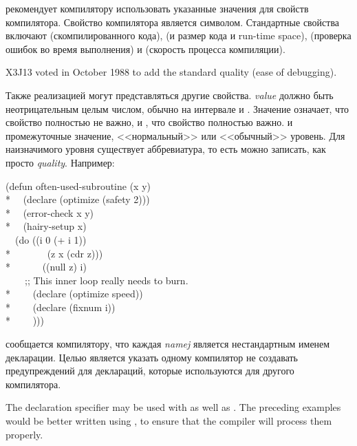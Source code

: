 \begin{flushdesc}
\item[\cdf{optimize}]
рекомендует компилятору использовать указанные значения для свойств компилятора.
Свойство компилятора является символом. Стандартные свойства включают 
 (скомпилированного кода),  (и размер кода и run-time
space),  (проверка ошибок во время выполнения) и
 (скорость процесса компиляции).

\begin{newer}
X3J13 voted in October 1988  to add
the standard quality  (ease of debugging).
\end{newer}

Также реализацией могут представляться другие свойства. \emph{value} должно быть
неотрицательным целым числом, обычно на интервале  и . Значение
 означает, что свойство полностью не важно, и , что свойство
полностью важно.
 и  промежуточные значение,  <<нормальный>> или <<обычный>>
уровень.
Для наизначимого уровня существует аббревиатура, то есть 
можно записать, как просто \emph{quality}.
Например:
\begin{lisp}
(defun often-used-subroutine (x y) \\*
~~(declare (optimize (safety 2))) \\*
~~(error-check x y) \\*
~~(hairy-setup x) \\
~~(do ((i 0 (+ i 1)) \\*
~~~~~~~(z x (cdr z))) \\*
~~~~~~((null z) i) \\
~~~~;; This inner loop really needs to burn. \\*
~~~~(declare (optimize speed)) \\*
~~~~(declare (fixnum i)) \\*
~~~~)))
\end{lisp}

\item[\cdf{declaration}]
 сообщается компилятору, что
каждая \emph{namej} является нестандартным именем декларации.
Целью является указать одному компилятор не создавать предупреждений для
деклараций, которые используются для другого компилятора.


The  declaration specifier may be used with 
as well as .  The preceding examples would be better written
using , to ensure that the compiler will process them properly.


\end{flushdesc}
